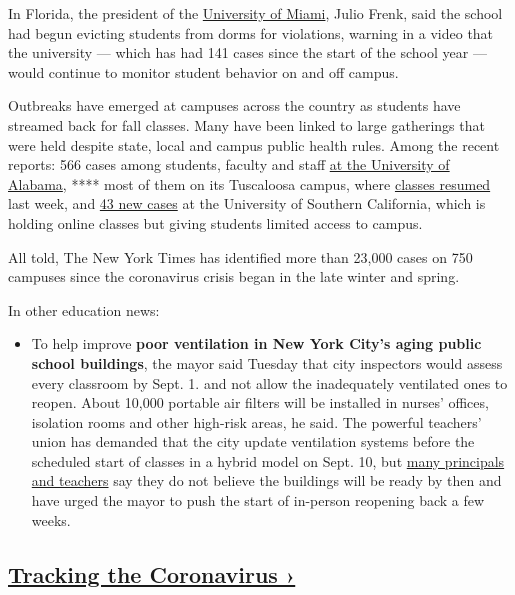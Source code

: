 In Florida, the president of the
\href{https://messages.miami.edu/messages/2020/08/08-24-20-presidents-letter.html}{University
of Miami}, Julio Frenk, said the school had begun evicting students from
dorms for violations, warning in a video that the university --- which
has had 141 cases since the start of the school year --- would continue
to monitor student behavior on and off campus.

Outbreaks have emerged at campuses across the country as students have
streamed back for fall classes. Many have been linked to large
gatherings that were held despite state, local and campus public health
rules. Among the recent reports: 566 cases among students, faculty and
staff \href{https://uasystem.edu/covid-19-dashboard?0}{at the University
of Alabama}, **** most of them on its Tuscaloosa campus, where
\href{https://www.al.com/news/2020/08/university-of-alabama-reports-more-than-500-confirmed-covid-19-cases.html?outputType=amp\&__twitter_impression=true}{classes
resumed} last week, and
\href{https://coronavirus.usc.edu/2020/08/24/8-24-community-health-advisory-covid-19-cases-in-off-campus-residences/}{43
new cases} at the University of Southern California, which is holding
online classes but giving students limited access to campus.

All told, The New York Times has identified more than 23,000 cases on
750 campuses since the coronavirus crisis began in the late winter and
spring.

In other education news:

\begin{itemize}
\tightlist
\item
  To help improve \textbf{poor ventilation in New York City's aging
  public school buildings}, the mayor said Tuesday that city inspectors
  would assess every classroom by Sept. 1. and not allow the
  inadequately ventilated ones to reopen. About 10,000 portable air
  filters will be installed in nurses' offices, isolation rooms and
  other high-risk areas, he said. The powerful teachers' union has
  demanded that the city update ventilation systems before the scheduled
  start of classes in a hybrid model on Sept. 10, but
  \href{https://www.nytimes3xbfgragh.onion/2020/08/14/nyregion/nyc-schools-reopening-plan.html}{many
  principals and teachers} say they do not believe the buildings will be
  ready by then and have urged the mayor to push the start of in-person
  reopening back a few weeks.
\end{itemize}

\hypertarget{tracking-the-coronavirus-}{%
\subsection{\texorpdfstring{\href{https://www.nytimes3xbfgragh.onion/interactive/2020/us/coronavirus-us-cases.html}{Tracking
the Coronavirus
›}}{Tracking the Coronavirus ›}}\label{tracking-the-coronavirus-}}

